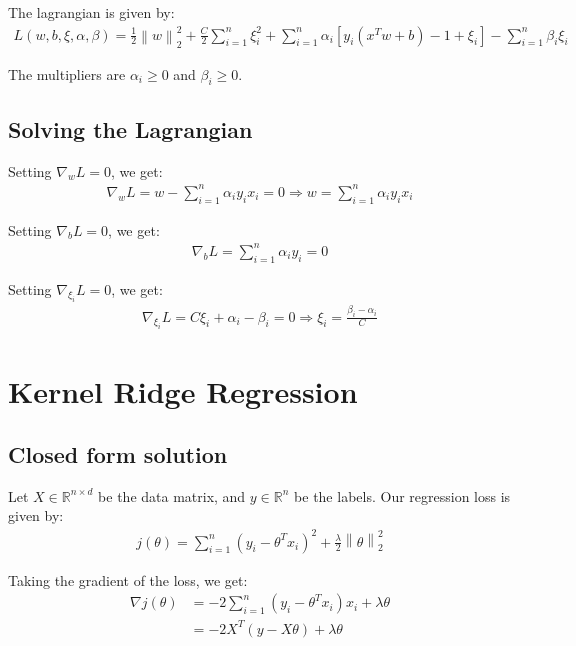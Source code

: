 \documentclass[a4paper]{article}
\newcommand{\norm}[1]{\left\lVert#1\right\rVert}
\begin{document}
The lagrangian is given by:
\begin{align*}
    L(w, b, \xi, \alpha, \beta) = \frac{1}{2} \norm{w}_2^2 + \frac{C}{2} \sum_{i=1}^n \xi_i ^ 2 + \sum_{i=1}^n \alpha_i \left[ y_i (x^T w + b) - 1 + \xi_i \right] - \sum_{i=1}^n \beta_i \xi_i
\end{align*}

The multipliers are $\alpha_i \geq 0$ and $\beta_i \geq 0$. 

\subsection{Solving the Lagrangian}

Setting $\nabla_w L = 0$, we get:
\begin{align*}
    \nabla_w L = w - \sum_{i=1}^n \alpha_i y_i x_i = 0 \Rightarrow w = \sum_{i=1}^n \alpha_i y_i x_i
\end{align*}

Setting $\nabla_b L = 0$, we get:
\begin{align*}
    \nabla_b L = \sum_{i=1}^n \alpha_i y_i = 0
\end{align*}

Setting $\nabla_{\xi_i} L = 0$, we get:
\begin{align*}
    \nabla_{\xi_i} L = C\xi_i + \alpha_i - \beta_i = 0 \Rightarrow \xi_i = \frac{\beta_i - \alpha_i}{C}
\end{align*}

\newpage

\section{Kernel Ridge Regression}

\subsection{Closed form solution}

Let $X \in \mathbb{R}^{n \times d}$ be the data matrix, and $y \in \mathbb{R}^n$ be the labels. Our regression loss is given by:
\begin{align*}
    j(\theta) = \sum_{i=1}^n (y_i - \theta^T x_i)^2 + \frac{\lambda}{2} \norm{\theta}_2^2
\end{align*}

Taking the gradient of the loss, we get:
\begin{align*}
    \nabla j(\theta) &= -2\sum_{i=1}^n (y_i - \theta^T x_i)x_i + \lambda \theta\\
    &= -2X^T (y - X\theta) + \lambda \theta
\end{align*}
\end{document}
